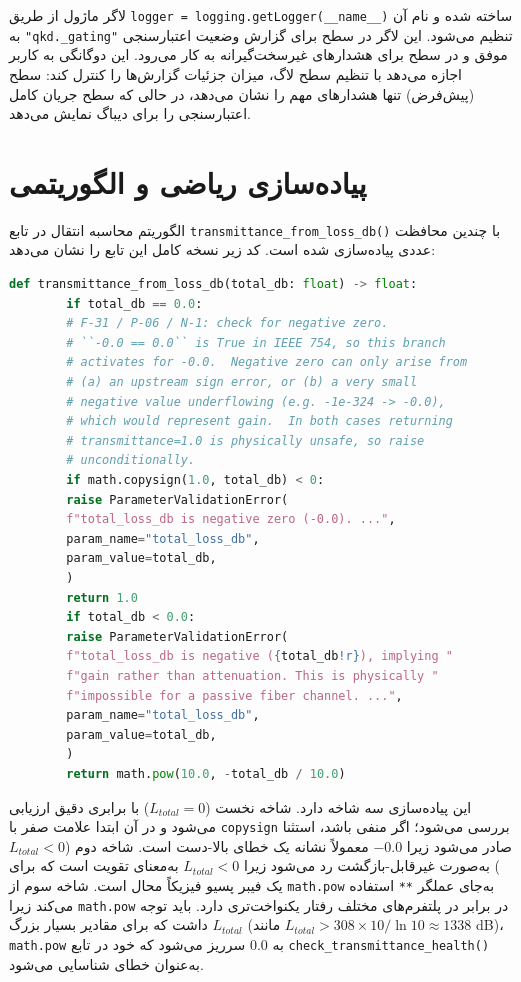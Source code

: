 لاگر ماژول از طریق \texttt{logger = logging.getLogger(\_\_name\_\_)} ساخته شده و نام آن به \texttt{"qkd.\_gating"} تنظیم می‌شود. این لاگر در سطح  برای گزارش وضعیت اعتبارسنجی موفق و در سطح  برای هشدارهای غیرسخت‌گیرانه به کار می‌رود. این دوگانگی به کاربر اجازه می‌دهد با تنظیم سطح لاگ، میزان جزئیات گزارش‌ها را کنترل کند: سطح  (پیش‌فرض) تنها هشدارهای مهم را نشان می‌دهد، در حالی که سطح  جریان کامل اعتبارسنجی را برای دیباگ نمایش می‌دهد.

\section{پیاده‌سازی ریاضی و الگوریتمی}

الگوریتم محاسبه انتقال در تابع \texttt{transmittance\_from\_loss\_db()} با چندین محافظت عددی پیاده‌سازی شده است. کد زیر نسخه کامل این تابع را نشان می‌دهد:

\begin{LTR}
	\begin{lstlisting}[language=Python]
		def transmittance_from_loss_db(total_db: float) -> float:
		if total_db == 0.0:
		# F-31 / P-06 / N-1: check for negative zero.
		# ``-0.0 == 0.0`` is True in IEEE 754, so this branch
		# activates for -0.0.  Negative zero can only arise from
		# (a) an upstream sign error, or (b) a very small
		# negative value underflowing (e.g. -1e-324 -> -0.0),
		# which would represent gain.  In both cases returning
		# transmittance=1.0 is physically unsafe, so raise
		# unconditionally.
		if math.copysign(1.0, total_db) < 0:
		raise ParameterValidationError(
		f"total_loss_db is negative zero (-0.0). ...",
		param_name="total_loss_db",
		param_value=total_db,
		)
		return 1.0
		if total_db < 0.0:
		raise ParameterValidationError(
		f"total_loss_db is negative ({total_db!r}), implying "
		f"gain rather than attenuation. This is physically "
		f"impossible for a passive fiber channel. ...",
		param_name="total_loss_db",
		param_value=total_db,
		)
		return math.pow(10.0, -total_db / 10.0)
	\end{lstlisting}
\end{LTR}

این پیاده‌سازی سه شاخه دارد. شاخه نخست ($L_{total} = 0$) با برابری دقیق ارزیابی می‌شود و در آن ابتدا علامت صفر با \texttt{copysign} بررسی می‌شود؛ اگر منفی باشد، استثنا صادر می‌شود زیرا $-0.0$ معمولاً نشانه یک خطای بالا-دست است. شاخه دوم ($L_{total} < 0$) به‌صورت غیرقابل-بازگشت رد می‌شود زیرا $L_{total} < 0$ به‌معنای تقویت  است که برای یک فیبر پسیو فیزیکاً محال است. شاخه سوم از \texttt{math.pow} به‌جای عملگر \texttt{**} استفاده می‌کند زیرا \texttt{math.pow} در برابر  در پلتفرم‌های مختلف رفتار یکنواخت‌تری دارد. باید توجه داشت که برای مقادیر بسیار بزرگ $L_{total}$ (مانند $L_{total} > 308 \times 10 / \ln 10 \approx 1338$ dB)، \texttt{math.pow} به $0.0$ سرریز می‌شود که خود در تابع \texttt{check\_transmittance\_health()} به‌عنوان خطای  شناسایی می‌شود.


